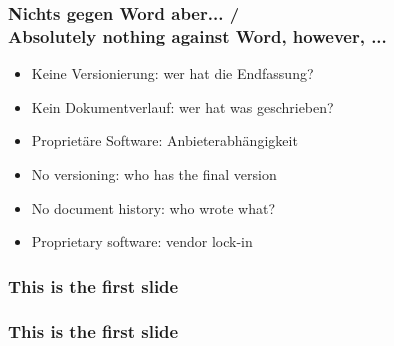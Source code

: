 \documentclass{beamer}
\begin{document}
\begin{frame}
  \frametitle{Nichts gegen Word\textsuperscript{\tiny\textregistered} aber... / \\
    \textcolor{mfn_green}{Absolutely nothing against Word\textsuperscript{\tiny\textregistered}, however, ...}}
  \begin{itemize}
  \item{Keine Versionierung: wer hat die Endfassung?}
  \item{Kein Dokumentverlauf: wer hat was geschrieben?}
  \item{Proprietäre Software: Anbieterabhängigkeit}
  \end{itemize}
  
  \begin{itemize}
  \item{\textcolor{mfn_green}{No versioning: who has the final version}}
  \item{\textcolor{mfn_green}{No document history: who wrote what?}}
  \item{\textcolor{mfn_green}{Proprietary software: vendor lock-in}}
  \end{itemize}
\end{frame}


\begin{frame}
  \frametitle{This is the first slide}
\end{frame}

\begin{frame}
  \frametitle{This is the first slide}
\end{frame}
\end{document}
